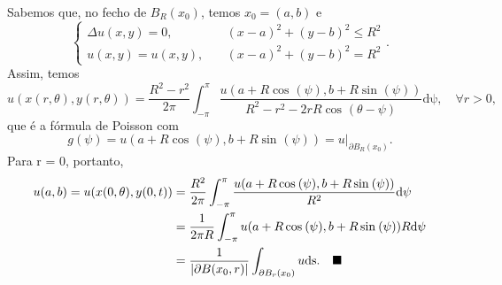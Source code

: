 \documentclass[../pde_notes.tex]{subfiles}
\begin{document}
\begin{proof*}
	Sabemos que, no fecho de \(B_R(x_{0})\), temos \(x_{0} = (a, b)\) e
	\[
		\left\{\begin{array}{ll}
			\Delta u(x, y) = 0, & \quad (x-a)^{2}+(y-b)^{2}\leq R^{2} \\
			u(x, y) = u(x, y),  & \quad (x-a)^{2}+(y-b)^{2} = R^{2}
		\end{array}\right..
	\]
	Assim, temos
	\[
		u(x(r, \theta ), y(r, \theta )) = \frac{R^{2}-r^{2}}{2\pi }\int_{-\pi }^{\pi }\frac{u(a+R\cos^{}{(\psi )}, b+ R\sin^{}{(\psi )})}{R^{2}-r^{2}-2rR\cos^{}{(\theta -\psi )}} \mathrm{d\psi },\quad \forall r>0,
	\]
	que é a fórmula de Poisson com
	\[
		g(\psi ) = u(a+R\cos^{}{(\psi )}, b + R \sin^{}{(\psi )}) = u|_{\partial B_R(x_{0})}.
	\]
	Para r = 0, portanto,
	\begin{align*}
		u(a, b) = u(x(0, \theta ), y(0, t)) & = \frac{R^{2}}{2\pi }\int_{-\pi }^{\pi }\frac{u(a+R\cos^{}{(\psi )}, b+R\sin^{}{(\psi )})}{R^{2}} \mathrm{d\psi } \\
		                                    & = \frac{1}{2\pi R}\int_{-\pi }^{\pi }u(a + R\cos^{}{(\psi )}, b+R\sin^{}{(\psi )})R \mathrm{d\psi }               \\
		                                    & = \frac{1}{|\partial B(x_{0}, r)|}\int_{\partial B_r(x_{0})}^{}u \mathrm{ds}.\quad \text{$\blacksquare$}
	\end{align*}
\end{proof*}
\end{document}
